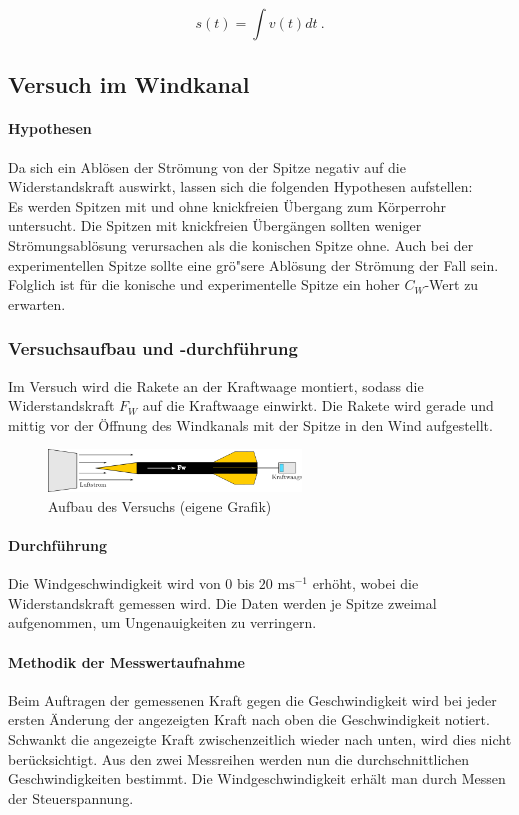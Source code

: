 \documentclass[10pt,a4paper]{article}
\begin{document}
$$ s(t) = \int v(t)dt \ . $$


\subsection{Versuch im Windkanal}

\paragraph{Hypothesen}
Da sich ein Ablösen der Strömung von der Spitze negativ auf die Widerstandskraft auswirkt, lassen sich die folgenden Hypothesen aufstellen: \\
Es werden Spitzen mit und ohne knickfreien Übergang zum Körperrohr untersucht. Die Spitzen mit knickfreien Übergängen  sollten weniger Strömungsablösung verursachen als die konischen Spitze ohne. Auch bei der experimentellen Spitze sollte eine grö"sere Ablösung der Strömung der Fall sein. Folglich ist für die konische und experimentelle Spitze ein hoher $C_{W}$-Wert zu erwarten.


\subsubsection{Versuchsaufbau und -durchführung}

Im Versuch wird die Rakete an der Kraftwaage montiert, sodass die Widerstandskraft $F_{W}$ auf die Kraftwaage einwirkt. Die Rakete wird gerade und mittig vor der Öffnung des Windkanals mit der Spitze in den Wind aufgestellt. 

\begin{figure}[H]
	\centering
	\includegraphics[width=0.6\textwidth]{Bilder/Versuchsaufbau.png}
	\caption{Aufbau des Versuchs (eigene Grafik)}
\end{figure}

\paragraph{Durchführung}
Die Windgeschwindigkeit wird von 0 bis $20 \text{ ms}^{-1}$ erhöht, wobei die Widerstandskraft gemessen wird. Die Daten werden je Spitze zweimal aufgenommen, um Ungenauigkeiten zu verringern.

\paragraph{Methodik der Messwertaufnahme}
Beim Auftragen der gemessenen Kraft gegen die Geschwindigkeit wird bei jeder ersten Änderung der  angezeigten Kraft nach oben die Geschwindigkeit notiert. Schwankt die angezeigte Kraft zwischenzeitlich wieder nach unten, wird dies nicht berücksichtigt. Aus den zwei Messreihen werden nun die durchschnittlichen Geschwindigkeiten bestimmt. Die Windgeschwindigkeit erhält man durch Messen der Steuerspannung.
\end{document}
